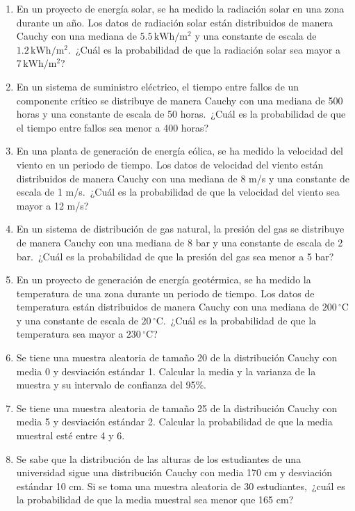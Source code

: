 \begin{Ejer}
\begin{enumerate}
\item En un proyecto de energ\'ia solar, se ha medido la radiaci\'on solar en una zona durante un a\~no. Los datos de radiaci\'on solar est\'an distribuidos de manera Cauchy con una mediana de $5.5\,\mathrm{kWh/m^2}$ y una constante de escala de $1.2\,\mathrm{kWh/m^2}$. \,¿Cu\'al es la probabilidad de que la radiaci\'on solar sea mayor a $7\,\mathrm{kWh/m^2}$?

\item En un sistema de suministro el\'ectrico, el tiempo entre fallos de un componente cr\'itico se distribuye de manera Cauchy con una mediana de 500 horas y una constante de escala de 50 horas. \,¿Cu\'al es la probabilidad de que el tiempo entre fallos sea menor a 400 horas?

\item En una planta de generaci\'on de energ\'ia e\'olica, se ha medido la velocidad del viento en un periodo de tiempo. Los datos de velocidad del viento est\'an distribuidos de manera Cauchy con una mediana de 8 m/s y una constante de escala de 1 m/s. \,¿Cu\'al es la probabilidad de que la velocidad del viento sea mayor a 12 m/s?

\item En un sistema de distribuci\'on de gas natural, la presi\'on del gas se distribuye de manera Cauchy con una mediana de 8 bar y una constante de escala de 2 bar. \,¿Cu\'al es la probabilidad de que la presi\'on del gas sea menor a 5 bar?

\item En un proyecto de generaci\'on de energ\'ia geot\'ermica, se ha medido la temperatura de una zona durante un periodo de tiempo. Los datos de temperatura est\'an distribuidos de manera Cauchy con una mediana de $200\,^\circ\mathrm{C}$ y una constante de escala de $20\,^\circ\mathrm{C}$. \,¿Cu\'al es la probabilidad de que la temperatura sea mayor a $230\,^\circ\mathrm{C}$?

\item Se tiene una muestra aleatoria de tama\~no 20 de la distribuci\'on Cauchy con media 0 y desviaci\'on est\'andar 1. Calcular la media y la varianza de la muestra y su intervalo de confianza del 95\%.

\item Se tiene una muestra aleatoria de tama\~no 25 de la distribuci\'on Cauchy con media 5 y desviaci\'on est\'andar 2. Calcular la probabilidad de que la media muestral est\'e entre 4 y 6.

\item Se sabe que la distribuci\'on de las alturas de los estudiantes de una universidad sigue una distribuci\'on Cauchy con media 170 cm y desviaci\'on est\'andar 10 cm. Si se toma una muestra aleatoria de 30 estudiantes, \,¿cu\'al es la probabilidad de que la media muestral sea menor que 165 cm?

\end{enumerate}
\end{Ejer} 


